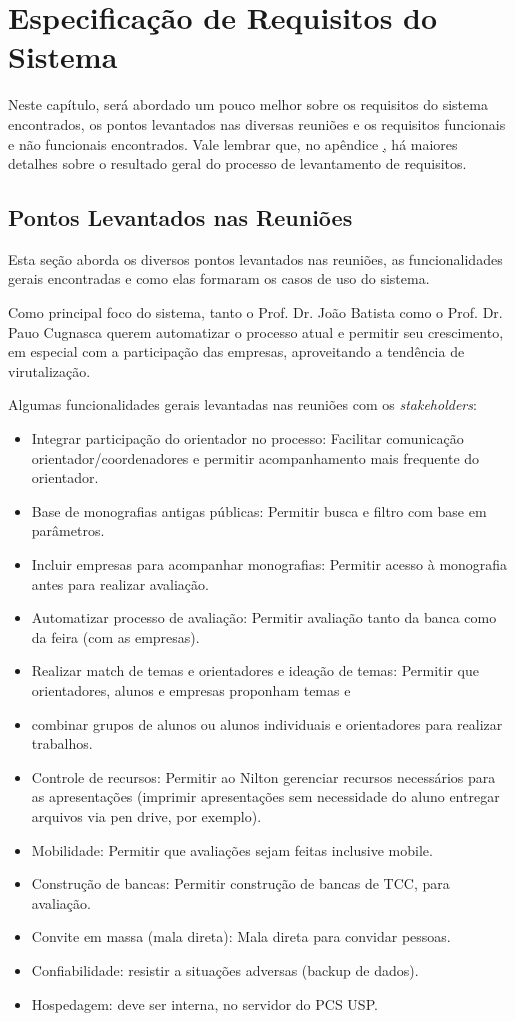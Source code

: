 \chapter{Especificação de Requisitos do Sistema}\label{chap:especificacao-requisitos-sistema}
Neste capítulo, será abordado um pouco melhor sobre os requisitos do sistema encontrados, os pontos levantados nas diversas reuniões e os requisitos funcionais e não funcionais encontrados. Vale lembrar que, no apêndice \href{chap:vision-doc-appendix}, há maiores detalhes sobre o resultado geral do processo de levantamento de requisitos.

\section{Pontos Levantados nas Reuniões}
Esta seção aborda os diversos pontos levantados nas reuniões, as funcionalidades gerais encontradas e como elas formaram os casos de uso do sistema.

Como principal foco do sistema, tanto o Prof. Dr. João Batista como o Prof. Dr. Pauo Cugnasca querem automatizar o processo atual e permitir seu crescimento, em especial com a participação das empresas, aproveitando a tendência de virutalização.

Algumas funcionalidades gerais levantadas nas reuniões com os \textit{stakeholders}:

\begin{itemize}
    \item Integrar participação do orientador no processo: Facilitar comunicação orientador/coordenadores e permitir acompanhamento mais frequente do orientador.
    \item Base de monografias antigas públicas: Permitir busca e filtro com base em parâmetros.
    \item Incluir empresas para acompanhar monografias: Permitir acesso à monografia antes para realizar avaliação.
    \item Automatizar processo de avaliação: Permitir avaliação tanto da banca como da feira (com as empresas).
    \item Realizar match de temas e orientadores e ideação de temas: Permitir que orientadores, alunos e empresas proponham temas e
    \item combinar grupos de alunos ou alunos individuais e orientadores para realizar trabalhos.
    \item Controle de recursos: Permitir ao Nilton gerenciar recursos necessários para as apresentações (imprimir apresentações sem necessidade do aluno entregar arquivos via pen drive, por exemplo).
    \item Mobilidade: Permitir que avaliações sejam feitas inclusive mobile.
    \item Construção de bancas: Permitir construção de bancas de TCC, para avaliação.
    \item Convite em massa (mala direta): Mala direta para convidar pessoas.
    \item Confiabilidade: resistir a situações adversas (backup de dados).
    \item Hospedagem: deve ser interna, no servidor do PCS USP.
\end{itemize}

